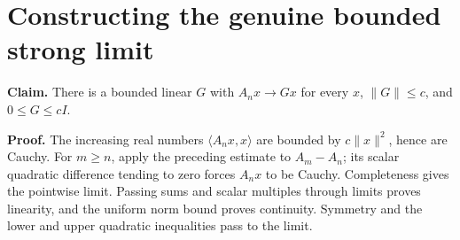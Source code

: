 \documentclass[11pt,a4paper]{article}
\begin{document}
\section{\texorpdfstring{Constructing the genuine bounded strong limit}{Constructing the genuine bounded strong limit}}


\textbf{Claim.} There is a bounded linear \(G\) with \(A_nx\to Gx\) for every \(x\), \(\|G\|\le c\), and \(0\le G\le cI\).



\textbf{Proof.} The increasing real numbers \(\langle A_nx,x\rangle\) are bounded by \(c\|x\|^2\), hence are Cauchy. For \(m\ge n\), apply the preceding estimate to \(A_m-A_n\); its scalar quadratic difference tending to zero forces \(A_nx\) to be Cauchy. Completeness gives the pointwise limit. Passing sums and scalar multiples through limits proves linearity, and the uniform norm bound proves continuity. Symmetry and the lower and upper quadratic inequalities pass to the limit.
\end{document}

